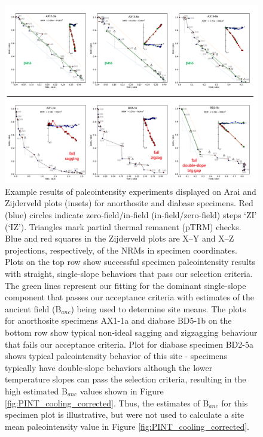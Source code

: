 \documentclass[draft]{agujournal2019}
\begin{document}
\begin{figure}[h!]
\noindent\includegraphics[width=\textwidth]{IZZI_examples.pdf}
\centering
\caption{\footnotesize{Example results of paleointensity experiments displayed on Arai and Zijderveld plots (insets) for anorthosite and diabase specimens. Red (blue) circles indicate zero-field/in-field (in-field/zero-field) steps `ZI’ (`IZ’). Triangles mark partial thermal remanent (pTRM) checks. Blue and red squares in the Zijderveld plots are X–Y and X–Z projections, respectively, of the NRMs in specimen coordinates. Plots on the top row show successful specimen paleointensity results with straight, single-slope behaviors that pass our selection criteria. The green lines represent our fitting for the dominant single-slope component that passes our acceptance criteria with estimates of the ancient field (B$_{anc}$) being used to determine site means. The plots for anorthosite specimens AX1-1a and diabase BD5-1b on the bottom row show typical non-ideal sagging and zigzagging behaviour that fails our acceptance criteria. Plot for diabase specimen BD2-5a shows typical paleointensity behavior of this site - specimens typically have double-slope behaviors although the lower temperature slopes can pass the selection criteria, resulting in the high estimated B$_{anc}$ values shown in Figure \ref{fig:PINT_cooling_corrected}. Thus, the estimates of B$_{anc}$ for this specimen plot is illustrative, but were not used to calculate a site mean paleointensity value in Figure \ref{fig:PINT_cooling_corrected}.}}
\label{fig:IZZI_examples}
\end{figure}
\end{document}

